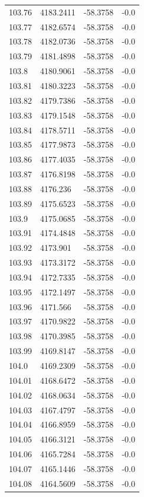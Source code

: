 \begin{table}[H]
\begin{tabular}{llll}
103.76 & 4183.2411 & -58.3758 & -0.0 \\
103.77 & 4182.6574 & -58.3758 & -0.0 \\
103.78 & 4182.0736 & -58.3758 & -0.0 \\
103.79 & 4181.4898 & -58.3758 & -0.0 \\
103.8 & 4180.9061 & -58.3758 & -0.0 \\
103.81 & 4180.3223 & -58.3758 & -0.0 \\
103.82 & 4179.7386 & -58.3758 & -0.0 \\
103.83 & 4179.1548 & -58.3758 & -0.0 \\
103.84 & 4178.5711 & -58.3758 & -0.0 \\
103.85 & 4177.9873 & -58.3758 & -0.0 \\
103.86 & 4177.4035 & -58.3758 & -0.0 \\
103.87 & 4176.8198 & -58.3758 & -0.0 \\
103.88 & 4176.236 & -58.3758 & -0.0 \\
103.89 & 4175.6523 & -58.3758 & -0.0 \\
103.9 & 4175.0685 & -58.3758 & -0.0 \\
103.91 & 4174.4848 & -58.3758 & -0.0 \\
103.92 & 4173.901 & -58.3758 & -0.0 \\
103.93 & 4173.3172 & -58.3758 & -0.0 \\
103.94 & 4172.7335 & -58.3758 & -0.0 \\
103.95 & 4172.1497 & -58.3758 & -0.0 \\
103.96 & 4171.566 & -58.3758 & -0.0 \\
103.97 & 4170.9822 & -58.3758 & -0.0 \\
103.98 & 4170.3985 & -58.3758 & -0.0 \\
103.99 & 4169.8147 & -58.3758 & -0.0 \\
104.0 & 4169.2309 & -58.3758 & -0.0 \\
104.01 & 4168.6472 & -58.3758 & -0.0 \\
104.02 & 4168.0634 & -58.3758 & -0.0 \\
104.03 & 4167.4797 & -58.3758 & -0.0 \\
104.04 & 4166.8959 & -58.3758 & -0.0 \\
104.05 & 4166.3121 & -58.3758 & -0.0 \\
104.06 & 4165.7284 & -58.3758 & -0.0 \\
104.07 & 4165.1446 & -58.3758 & -0.0 \\
104.08 & 4164.5609 & -58.3758 & -0.0 \\

\end{tabular}
\end{table}
